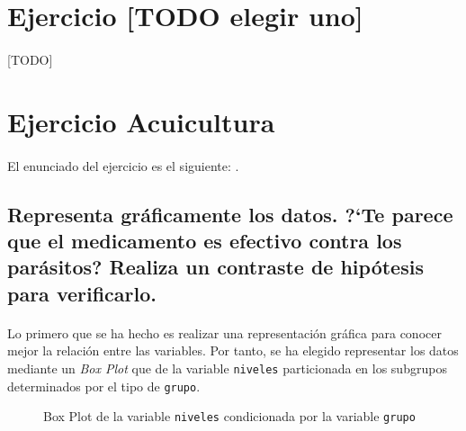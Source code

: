 \documentclass{article}
\begin{document}
  \maketitle

  \section{Ejercicio [TODO elegir uno] }

    \paragraph{}
    [TODO]

  \section{Ejercicio Acuicultura}

    \paragraph{}
    El enunciado del ejercicio es el siguiente: .


    \subsection{Representa gráficamente los datos. ?`Te parece que el medicamento es efectivo contra los parásitos? Realiza un contraste de hipótesis para verificarlo.}

      \paragraph{}
      Lo primero que se ha hecho es realizar una representación gráfica para conocer mejor la relación entre las variables. Por tanto, se ha elegido representar los datos mediante un \emph{Box Plot} que de la variable \texttt{niveles} particionada en los subgrupos determinados por el tipo de \texttt{grupo}.

      \begin{figure}
        \caption{Box Plot de la variable \texttt{niveles} condicionada por la variable \texttt{grupo}}
        \label{fig:figura_1}
      \end{figure}
\end{document}
